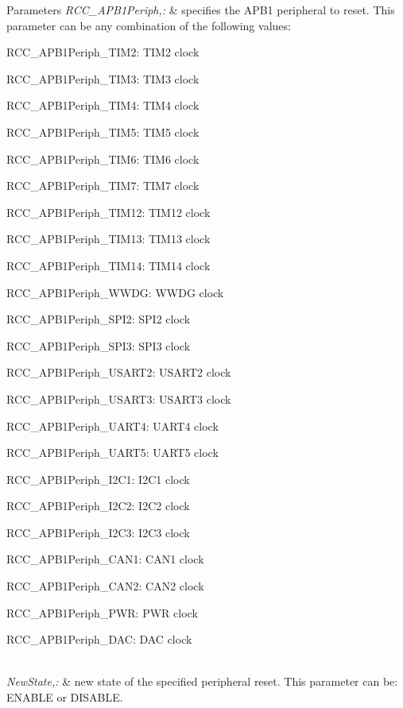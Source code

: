 \begin{DoxyParams}{Parameters}
{\em R\-C\-C\-\_\-\-A\-P\-B1\-Periph,\-:} & specifies the A\-P\-B1 peripheral to reset. This parameter can be any combination of the following values\-: \begin{DoxyItemize}
\item R\-C\-C\-\_\-\-A\-P\-B1\-Periph\-\_\-\-T\-I\-M2\-: T\-I\-M2 clock \item R\-C\-C\-\_\-\-A\-P\-B1\-Periph\-\_\-\-T\-I\-M3\-: T\-I\-M3 clock \item R\-C\-C\-\_\-\-A\-P\-B1\-Periph\-\_\-\-T\-I\-M4\-: T\-I\-M4 clock \item R\-C\-C\-\_\-\-A\-P\-B1\-Periph\-\_\-\-T\-I\-M5\-: T\-I\-M5 clock \item R\-C\-C\-\_\-\-A\-P\-B1\-Periph\-\_\-\-T\-I\-M6\-: T\-I\-M6 clock \item R\-C\-C\-\_\-\-A\-P\-B1\-Periph\-\_\-\-T\-I\-M7\-: T\-I\-M7 clock \item R\-C\-C\-\_\-\-A\-P\-B1\-Periph\-\_\-\-T\-I\-M12\-: T\-I\-M12 clock \item R\-C\-C\-\_\-\-A\-P\-B1\-Periph\-\_\-\-T\-I\-M13\-: T\-I\-M13 clock \item R\-C\-C\-\_\-\-A\-P\-B1\-Periph\-\_\-\-T\-I\-M14\-: T\-I\-M14 clock \item R\-C\-C\-\_\-\-A\-P\-B1\-Periph\-\_\-\-W\-W\-D\-G\-: W\-W\-D\-G clock \item R\-C\-C\-\_\-\-A\-P\-B1\-Periph\-\_\-\-S\-P\-I2\-: S\-P\-I2 clock \item R\-C\-C\-\_\-\-A\-P\-B1\-Periph\-\_\-\-S\-P\-I3\-: S\-P\-I3 clock \item R\-C\-C\-\_\-\-A\-P\-B1\-Periph\-\_\-\-U\-S\-A\-R\-T2\-: U\-S\-A\-R\-T2 clock \item R\-C\-C\-\_\-\-A\-P\-B1\-Periph\-\_\-\-U\-S\-A\-R\-T3\-: U\-S\-A\-R\-T3 clock \item R\-C\-C\-\_\-\-A\-P\-B1\-Periph\-\_\-\-U\-A\-R\-T4\-: U\-A\-R\-T4 clock \item R\-C\-C\-\_\-\-A\-P\-B1\-Periph\-\_\-\-U\-A\-R\-T5\-: U\-A\-R\-T5 clock \item R\-C\-C\-\_\-\-A\-P\-B1\-Periph\-\_\-\-I2\-C1\-: I2\-C1 clock \item R\-C\-C\-\_\-\-A\-P\-B1\-Periph\-\_\-\-I2\-C2\-: I2\-C2 clock \item R\-C\-C\-\_\-\-A\-P\-B1\-Periph\-\_\-\-I2\-C3\-: I2\-C3 clock \item R\-C\-C\-\_\-\-A\-P\-B1\-Periph\-\_\-\-C\-A\-N1\-: C\-A\-N1 clock \item R\-C\-C\-\_\-\-A\-P\-B1\-Periph\-\_\-\-C\-A\-N2\-: C\-A\-N2 clock \item R\-C\-C\-\_\-\-A\-P\-B1\-Periph\-\_\-\-P\-W\-R\-: P\-W\-R clock \item R\-C\-C\-\_\-\-A\-P\-B1\-Periph\-\_\-\-D\-A\-C\-: D\-A\-C clock \end{DoxyItemize}
\\
\hline
{\em New\-State,\-:} & new state of the specified peripheral reset. This parameter can be\-: E\-N\-A\-B\-L\-E or D\-I\-S\-A\-B\-L\-E. \\
\hline
\end{DoxyParams}

